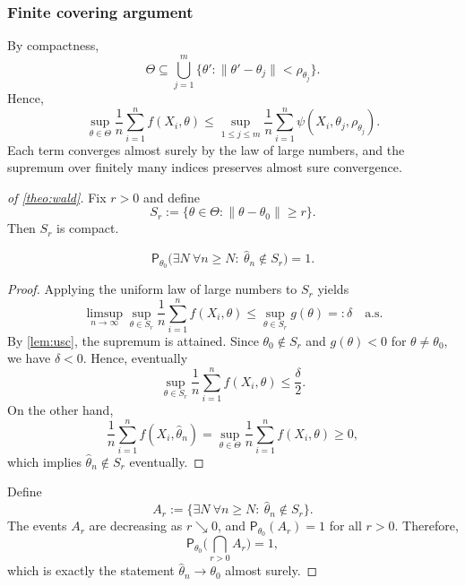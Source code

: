 \subsubsection{Finite covering argument}

By compactness,
\begin{equation*}
\Theta \subseteq \bigcup_{j=1}^m \{\theta':\|\theta'-\theta_j\|<\rho_{\theta_j}\}.
\end{equation*}
Hence,
\begin{equation*}
\sup_{\theta\in\Theta}\frac{1}{n}\sum_{i=1}^n f(X_i,\theta)
\le
\sup_{1\le j\le m}
\frac{1}{n}\sum_{i=1}^n
\psi(X_i,\theta_j,\rho_{\theta_j}).
\end{equation*}
Each term converges almost surely by the law of large numbers, and the supremum over finitely many indices preserves almost sure convergence.

\begin{proof}[of \autoref{theo:wald}]

Fix $r>0$ and define
\begin{equation*}
S_r := \{\theta\in\Theta:\|\theta-\theta_0\|\ge r\}.
\end{equation*}
Then $S_r$ is compact.

\begin{claim}
\label{cl:Sr}
\begin{equation*}
\mathsf{P}_{\theta_0}\big(\exists N\ \forall n\ge N:\ \hat{\theta}_n\notin S_r\big)=1.
\end{equation*}
\end{claim}

\begin{proof}
Applying the uniform law of large numbers to $S_r$ yields
\begin{equation*}
\limsup_{n\to\infty}\sup_{\theta\in S_r}
\frac{1}{n}\sum_{i=1}^n f(X_i,\theta)
\le
\sup_{\theta\in S_r} g(\theta)
=:\delta
\quad \text{a.s.}
\end{equation*}
By \autoref{lem:usc}, the supremum is attained. Since $\theta_0\notin S_r$ and $g(\theta)<0$ for $\theta\neq\theta_0$, we have $\delta<0$. Hence, eventually
\begin{equation*}
\sup_{\theta\in S_r}\frac{1}{n}\sum_{i=1}^n f(X_i,\theta)
\le \frac{\delta}{2}.
\end{equation*}
On the other hand,
\begin{equation*}
\frac{1}{n}\sum_{i=1}^n f(X_i,\hat{\theta}_n)
=
\sup_{\theta\in\Theta}\frac{1}{n}\sum_{i=1}^n f(X_i,\theta)
\ge 0,
\end{equation*}
which implies $\hat{\theta}_n\notin S_r$ eventually.
\end{proof}

Define
\begin{equation*}
A_r := \{\exists N\ \forall n\ge N:\ \hat{\theta}_n\notin S_r\}.
\end{equation*}
The events $A_r$ are decreasing as $r\searrow0$, and $\mathsf{P}_{\theta_0}(A_r)=1$ for all $r>0$. Therefore,
\begin{equation*}
\mathsf{P}_{\theta_0}\Big(\bigcap_{r>0} A_r\Big)=1,
\end{equation*}
which is exactly the statement $\hat{\theta}_n\to\theta_0$ almost surely.
\end{proof}

